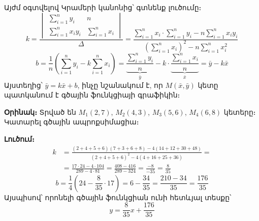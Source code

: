 \documentclass[12pt,a4paper]{article}
\numberwithin{equation}{section}
\numberwithin{figure}{section}
\begin{document}
Այժմ օգտվելով Կրամերի կանոնից՝ գտնենք լուծումը։
\[
k = \frac{
\begin{vmatrix}
\sum_{i=1}^n y_i & n \\[6pt]
\sum_{i=1}^n x_i y_i & \sum_{i=1}^n x_i
\end{vmatrix}}{\Delta}
= \frac{\displaystyle\sum_{i=1}^n x_i \cdot \sum_{i=1}^n y_i - n \sum_{i=1}^n x_i y_i}{\displaystyle\left(\sum_{i=1}^n x_i\right)^2 - n \sum_{i=1}^n x_i^2}
\]
\[
b = \frac{1}{n} \left( \sum_{i=1}^n y_i - k \sum_{i=1}^n x_i \right) = \underbrace{\frac{\sum_{i=1}^n y_i}{n}}_{\bar{y}} - k \cdot \underbrace{\frac{\sum_{i=1}^n x_i}{n}}_{\bar{x}} = \bar{y} - k\bar{x}
\]
Այստեղից՝ $\bar{y} = k\bar{x} + b$, ինչը նշանակում է, որ $M(\bar{x}, \bar{y})$ կետը պատկանում է գծային ֆունկցիայի գրաֆիկին։

\par\medskip\noindent\textbf{Օրինակ։} Տրված են $M_1(2, 7)$, $M_2(4, 3)$, $M_3(5, 6)$, $M_4(6, 8)$ կետերը։ Կատարել գծային ապրոքսիմացիա։

\par\medskip\noindent\textbf{Լուծում։}
\begin{align*}
k &= \frac{(2+4+5+6)(7+3+6+8) - 4(14+12+30+48)}{(2+4+5+6)^2 - 4(4+16+25+36)} = \\[8pt]
&= \frac{17 \cdot 24 - 4 \cdot 104}{289 - 4 \cdot 81} = \frac{408 - 416}{289 - 324} = \frac{-8}{-35} = \frac{8}{35}
\end{align*}
\[
b = \frac{1}{4}\left(24 - \frac{8}{35} \cdot 17\right) = 6 - \frac{34}{35} = \frac{210 - 34}{35} = \frac{176}{35}
\]
Այսպիսով՝ որոնելի գծային ֆունկցիան ունի հետևյալ տեսքը՝
\[
y = \frac{8}{35}x + \frac{176}{35}
\]
\end{document}
